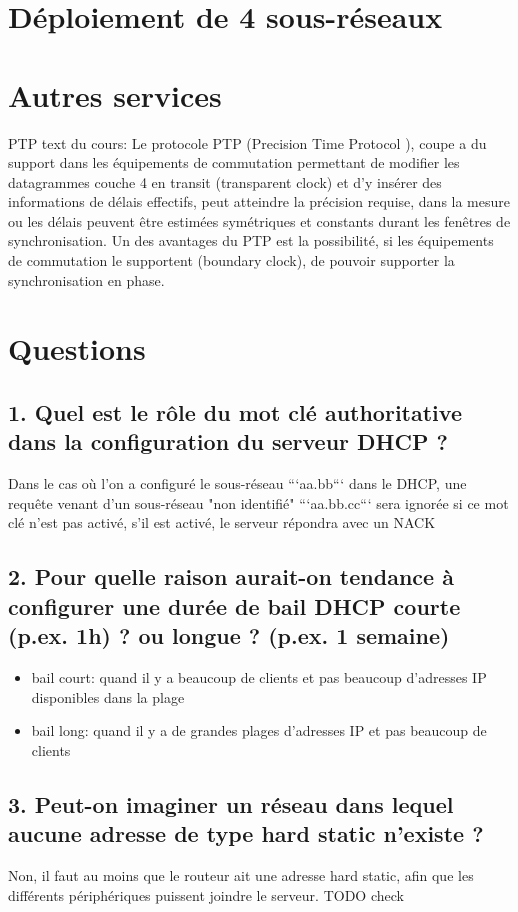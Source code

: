 \documentclass{article}
\begin{document}
\section{Déploiement de 4 sous-réseaux}

\section{Autres services}

PTP text du cours:
Le protocole PTP (Precision Time Protocol ), coupe a du support dans les équipements de commutation permettant de modifier les datagrammes couche 4 en transit (transparent clock) et d'y insérer des informations de délais effectifs, peut atteindre la précision requise, dans la mesure ou les délais peuvent être estimées symétriques et constants durant les fenêtres de synchronisation. Un des avantages du
PTP est la possibilité, si les équipements de commutation le supportent (boundary clock), de pouvoir supporter la synchronisation en phase.

\section{Questions}

\subsection*{1. Quel est le rôle du mot clé authoritative dans la configuration du serveur DHCP ?}
Dans le cas où l'on a configuré le sous-réseau ```aa.bb``` dans le DHCP, une requête venant d'un sous-réseau "non identifié" ```aa.bb.cc``` sera ignorée si ce mot clé n'est pas activé, s'il est activé, le serveur répondra avec un NACK

\subsection*{2. Pour quelle raison aurait-on tendance à configurer une durée de bail DHCP courte (p.ex. 1h) ? ou longue ? (p.ex. 1 semaine)}
\begin{itemize}
\item bail court: quand il y a beaucoup de clients et pas beaucoup d'adresses IP disponibles dans la plage
\item bail long: quand il y a de grandes plages d'adresses IP et pas beaucoup de clients
\end{itemize}

\subsection*{3. Peut-on imaginer un réseau dans lequel aucune adresse de type hard static n’existe ?}
Non, il faut au moins que le routeur ait une adresse hard static, afin que les différents périphériques puissent joindre le serveur.
TODO check
\end{document}
